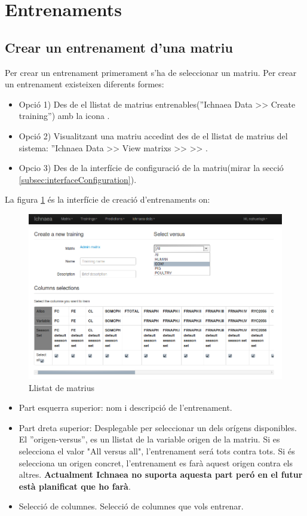 \section{Entrenaments}
\subsection{Crear un entrenament d'una matriu}
\label{subsec:createtraining}
Per crear un entrenament primerament s'ha de seleccionar un matriu. Per crear un entrenament existeixen diferents formes:
\begin{itemize} 
\item Opció 1) Des de el llistat de matrius entrenables(''Ichnaea Data >> Create training'') amb la icona \icontraining.
\item Opció 2) Visualitzant una matriu accedint des de el llistat de matrius del sistema: ''Ichnaea Data >> View matrixs >> \iconeyeopen >> \icontraining.
\item Opcio 3) Des de la interfície de configuració de la matriu(mirar la secció \ref{subsec:interfaceConfiguration}).
\end{itemize}

La figura \ref{fig:createTraining} \'{e}s la interfície de creació d'entrenaments on:
\begin{figure}[h!]
  \centering
  \includegraphics[scale=0.4]{img/userguide/training_create.png}
  \caption{Llistat de matrius}
  \label{fig:createTraining}
\end{figure}
\begin{itemize}
\item Part esquerra superior: nom i descripci\'{o} de l'entrenament.
\item Part dreta superior: Desplegable per seleccionar un dels orígens disponibles.  El ''origen-versus'', es un llistat de la variable origen de la matriu. Si es selecciona el valor "All versus all", l'entrenament ser\'{a} tots contra tots. Si \'{e}s selecciona un origen concret, l'entrenament es far\`{a} aquest origen contra els altres. \textbf{Actualment Ichnaea no suporta aquesta part per\'{o} en el futur est\`{a} planificat que ho far\`{a}}.
\item Selecci\'{o} de columnes. Selecci\'{o} de columnes que vols entrenar.
\end{itemize}

